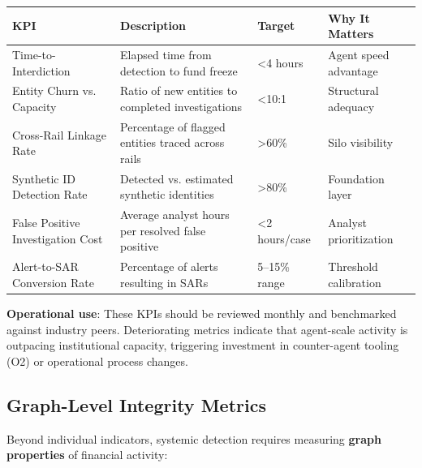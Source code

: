 \documentclass[11pt,letterpaper]{article}
\begin{document}
\begingroup\small
\begin{longtable}{L{0.26\dimexpr{}\tabcolsep\relax}L{0.37\dimexpr{}\tabcolsep\relax}L{0.16\dimexpr{}\tabcolsep\relax}L{0.21\dimexpr{}\tabcolsep\relax}}
\toprule
\textbf{KPI} & \textbf{Description} & \textbf{Target} & \textbf{Why It Matters} \\
\midrule
\endhead
Time-to-Interdiction & Elapsed time from detection to fund freeze & <4 hours & Agent speed advantage \\
Entity Churn vs. Capacity & Ratio of new entities to completed investigations & <10:1 & Structural adequacy \\
Cross-Rail Linkage Rate & Percentage of flagged entities traced across rails & >60\% & Silo visibility \\
Synthetic ID Detection Rate & Detected vs. estimated synthetic identities & >80\% & Foundation layer \\
False Positive Investigation Cost & Average analyst hours per resolved false positive & <2 hours/case & Analyst prioritization \\
Alert-to-SAR Conversion Rate & Percentage of alerts resulting in SARs & 5--15\% range & Threshold calibration \\
\bottomrule
\end{longtable}
\endgroup

\textbf{Operational use}: These KPIs should be reviewed monthly and benchmarked against industry peers. Deteriorating metrics indicate that agent-scale activity is outpacing institutional capacity, triggering investment in counter-agent tooling (O2) or operational process changes.

\subsection{Graph-Level Integrity Metrics}

Beyond individual indicators, systemic detection requires measuring \textbf{graph properties} of financial activity:
\end{document}
